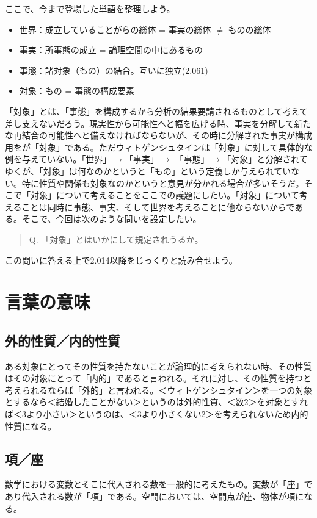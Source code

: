 \documentclass[a4paper,11pt]{jsarticle}
\begin{document}
ここで、今まで登場した単語を整理しよう。

\begin{itemize}
\item 世界：成立していることがらの総体 = 事実の総体 $\neq$ ものの総体
\item 事実：所事態の成立 = 論理空間の中にあるもの
\item 事態：諸対象（もの）の結合。互いに独立(2.061)
\item 対象：もの = 事態の構成要素

\end{itemize}

「対象」とは、「事態」を構成するから分析の結果要請されるものとして考えて差し支えないだろう。現実性から可能性へと幅を広げる時、事実を分解して新たな再結合の可能性へと備えなければならないが、その時に分解された事実が構成用をが「対象」である。ただウィトゲンシュタインは「対象」に対して具体的な例を与えていない。「世界」$\rightarrow$「事実」$\rightarrow$ 「事態」$\rightarrow$「対象」と分解されてゆくが、「対象」は何なのかというと「もの」という定義しか与えられていない。特に性質や関係も対象なのかというと意見が分かれる場合が多いそうだ。そこで「対象」について考えることをここでの議題にしたい。「対象」について考えることは同時に事態、事実、そして世界を考えることに他ならないからである。そこで、今回は次のような問いを設定したい。
\begin{quote}
Q. 「対象」とはいかにして規定されうるか。
\end{quote}
この問いに答える上で2.014以降をじっくりと読み合せよう。

\section{言葉の意味}
\subsection{外的性質／内的性質}
ある対象にとってその性質を持たないことが論理的に考えられない時、その性質はその対象にとって「内的」であると言われる。それに対し、その性質を持つと考えられるならば「外的」と言われる。＜ウィトゲンシュタイン＞を一つの対象とするなら＜結婚したことがない＞というのは外的性質、＜数2＞を対象とすれば＜3より小さい＞というのは、＜3より小さくない2＞を考えられないため内的性質になる。

\subsection{項／座}
数学における変数とそこに代入される数を一般的に考えたもの。変数が「座」であり代入される数が「項」である。空間においては、空間点が座、物体が項になる。
\end{document}
